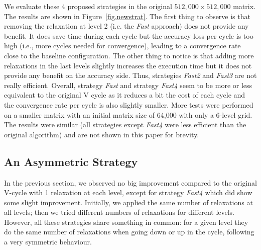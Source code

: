
We evaluate these 4 proposed strategies in the original $512,000\times
512,000$ matrix.  The results are shown in Figure~\ref{fig.newstrat}.  The
first thing to observe is that removing the relaxation at level 2 (i.e. the \emph{Fast} approach) does not
provide any benefit. It does save time during each cycle but the accuracy loss
per cycle is too high (i.e., more
cycles needed for convergence), leading to a convergence rate close to the baseline configuration.
The other thing to notice is that adding more
relaxations in the last levels slightly increases the execution time but it
does not provide any benefit on the accuracy side. Thus, strategies
\emph{Fast2} and \emph{Fast3} are not really efficient.  Overall, strategy \emph{Fast} and strategy
\emph{Fast4} seem to be more or less equivalent to the original V cycle as it
reduces a bit the cost of each cycle and the convergence rate per cycle is also
slightly smaller.  More tests were performed on a smaller matrix with an
initial matrix size of 64,000 with only a 6-level grid. The results were
similar (all strategies except \emph{Fast4} were less efficient than the original algorithm) and are not shown in this paper for brevity.




\subsection{An Asymmetric Strategy}
\label{sec.assymetric}

In the previous section, we observed no big improvement compared to the
original V-cycle with 1 relaxation at each level, except for strategy
\emph{Fast4} which did show some slight improvement. Initially, we applied the
same number of relaxations at all levels; then we tried different numbers of
relaxations for different levels. However, all these strategies share something
in common: for a given level they do the same number of relaxations when going
down or up in the cycle, following a very symmetric behaviour.

